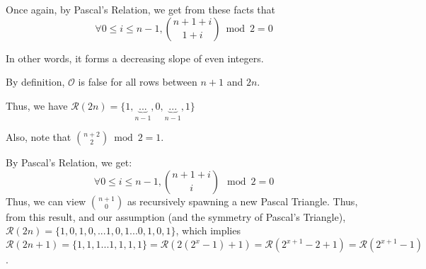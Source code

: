 \documentclass{article}
\newcommand{\pred}{\mathcal{O}}
\newcommand{\modrow}{\mathcal{R}}
\begin{document}
Once again, by Pascal's Relation, we get from these facts that
$$\forall 0 \leq i \leq {n - 1}, {{n+1 + i} \choose {1 + i}} \bmod 2 = 0$$

In other words, it forms a decreasing slope of even integers.

By definition, $\pred$ is false for all rows between $n+1$ and $2n$.

Thus, we have $\modrow(2n)=\{1,\underbrace{...}_{n-1},0,\underbrace{...}_{n-1},1\}$

Also, note that ${n+2 \choose 2} \bmod 2 = 1$.

By Pascal's Relation, we get: 
$$\forall 0 \leq i \leq {n-1}, {{n+1+i} \choose i} \mod 2 = 0$$
Thus, we can view ${n+1 \choose 0}$ as recursively spawning a new Pascal Triangle. Thus, from this result, and our assumption (and the symmetry of Pascal's Triangle), $\modrow(2n) = \{1,0,1,0,...1,0,1...0,1,0,1\}$, which implies $\modrow(2n+1) = \{1,1,1...1,1,1,1\} = \modrow(2(2^x-1)+1) = \modrow(2^{x+1}-2+1) =
\modrow(2^{x+1}-1)$.
\end{document}
